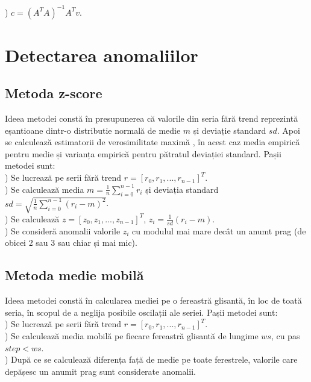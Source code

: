 ) $c = (A^TA)^{-1}A^Tv$.

\section{Detectarea anomaliilor}

\subsection{Metoda z-score}
\noindent Ideea metodei constă în presupunerea că valorile din seria fără trend reprezintă eșantioane dintr-o distributie normală de medie $m$ 
și deviație standard $sd$. Apoi se calculează estimatorii de verosimilitate maximă \cite{normal_mle}, în acest caz media empirică pentru medie 
și varianța empirică pentru pătratul deviației standard. Pașii metodei sunt:\\

) Se lucrează pe serii fără trend $r = [r_0, r_1, ..., r_{n-1}]^T$.\\

) Se calculează media $m = \frac{1}{n}\sum\limits_{i=0}^{n-1}r_i$ și deviația standard $sd = \sqrt{\frac{1}{n}\sum\limits_{i=0}^{n-1}(r_i-m)^2}$.\\

) Se calculează $z = [z_0, z_1, ..., z_{n-1}]^T$, $z_i = \frac{1}{sd}(r_i-m)$.\\

) Se consideră anomalii valorile $z_i$ cu modulul mai mare decât un anumt prag (de obicei 2 sau 3 sau chiar și mai mic).

\subsection{Metoda medie mobilă}
\noindent Ideea metodei constă în calcularea mediei pe o fereastră glisantă, în loc de toată seria, în scopul de a neglija posibile oscilații 
ale seriei. Pașii metodei sunt:\\

) Se lucrează pe serii fără trend $r = [r_0, r_1, ..., r_{n-1}]^T$.\\

) Se calculează media mobilă pe fiecare fereastră glisantă de lungime $ws$, cu pas $step < ws$.\\

) După ce se calculează diferența față de medie pe toate ferestrele, valorile care depășesc un anumit prag sunt considerate anomalii.

